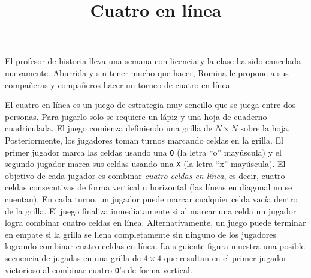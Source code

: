\documentclass{oci}
\title{Cuatro en línea}
\begin{document}
\begin{problemDescription}
  El profesor de historia lleva una semana con
  licencia y la clase ha sido cancelada nuevamente.
  Aburrida y sin tener mucho que hacer, Romina le
  propone a sus compañeras y compañeros hacer un torneo
  de cuatro en línea.

  El cuatro en línea es un juego de estrategia
  muy sencillo que se juega entre dos personas.
  Para jugarlo solo se requiere un lápiz y una hoja de
  cuaderno cuadriculada.
  El juego comienza definiendo una grilla de
  $N\times N$ sobre la hoja.
  Posteriormente, los jugadores toman turnos
  marcando celdas en la grilla.
  El primer jugador marca las celdas usando una
  \texttt{O} (la letra ``o'' mayúscula)
  y el segundo jugador marca sus celdas usando una
  \texttt{X} (la letra ``x'' mayúscula).
  El objetivo de cada jugador es combinar \emph{cuatro celdas
  en línea}, es decir, cuatro celdas consecutivas de forma
  vertical u horizontal (las líneas en diagonal no se cuentan).
  En cada turno, un jugador puede marcar cualquier celda vacía
  dentro de la grilla.
  El juego finaliza inmediatamente si al marcar una celda
  un jugador logra combinar cuatro celdas en línea.
  Alternativamente, un juego puede terminar en empate si la grilla
  se llena completamente sin ninguno de los jugadores logrando
  combinar cuatro celdas en línea.
  La siguiente figura muestra una posible secuencia de jugadas
  en una grilla de $4\times 4$ que resultan en el primer jugador
  victorioso al combinar cuatro \texttt{O}'s de forma vertical.
  \begin{center}
\end{center}
\end{problemDescription}
\end{document}
